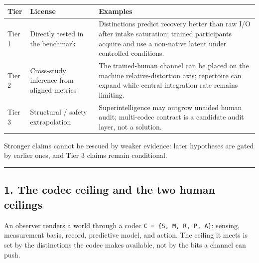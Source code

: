 \documentclass[
  11pt,
]{article}
\newcounter{none} %
\begin{document}
{\def\LTcaptype{none} %
\begin{longtable}[]{@{}
  >{\raggedright\arraybackslash}p{}
  >{\raggedright\arraybackslash}p{}
  >{\raggedright\arraybackslash}p{}@{}}
\toprule\noalign{}
\begin{minipage}[b]{\linewidth}\raggedright
Tier
\end{minipage} &
\begin{minipage}[b]{\linewidth}\raggedright
License
\end{minipage} &
\begin{minipage}[b]{\linewidth}\raggedright
Examples
\end{minipage} \\
\midrule\noalign{}
\endhead
\bottomrule\noalign{}
\endlastfoot
Tier 1 & Directly tested in the benchmark &
Distinctions predict recovery better than raw I/O after
intake saturation; trained participants acquire and use
a non-native latent under controlled conditions. \\
Tier 2 & Cross-study inference from aligned metrics &
The trained-human channel can be placed on the machine
relative-distortion axis; repertoire can expand while
central integration rate remains limiting. \\
Tier 3 & Structural / safety extrapolation &
Superintelligence may outgrow unaided human audit;
multi-codec contrast is a candidate audit layer, not a
solution. \\
\end{longtable}
}

Stronger claims cannot be rescued by weaker evidence:
later hypotheses are gated by earlier ones, and Tier 3
claims remain conditional.

\begin{center}\rule{0.5\linewidth}{0.5pt}\end{center}

\subsection{1. The codec ceiling and the two human
ceilings}\label{the-codec-ceiling-and-the-two-human-ceilings}

An observer renders a world through a codec
\texttt{C\ =\ \{S,\ M,\ R,\ P,\ A\}}: sensing,
measurement basis, record, predictive model, and
action. The ceiling it meets is set by the distinctions
the codec makes available, not by the bits a channel
can push.
\end{document}
